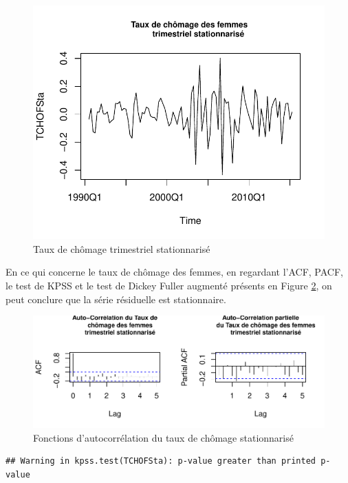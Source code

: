 \documentclass[11pt,]{article}
\begin{document}
\begin{figure}[htbp]
\centering
\includegraphics{Rapport_final_files/figure-latex/unnamed-chunk-21-1.pdf}
\caption{\label{fig17} Taux de chômage trimestriel stationnarisé}
\end{figure}

En ce qui concerne le taux de chômage des femmes, en regardant l'ACF,
PACF, le test de KPSS et le test de Dickey Fuller augmenté présents en
Figure \ref{fig18}, on peut conclure que la série résiduelle est
stationnaire.

\begin{figure}[htbp]
\centering
\includegraphics{Rapport_final_files/figure-latex/unnamed-chunk-22-1.pdf}
\caption{\label{fig18} Fonctions d'autocorrélation du taux de chômage
stationnarisé}
\end{figure}

\begin{verbatim}
## Warning in kpss.test(TCHOFSta): p-value greater than printed p-value
\end{verbatim}
\end{document}

